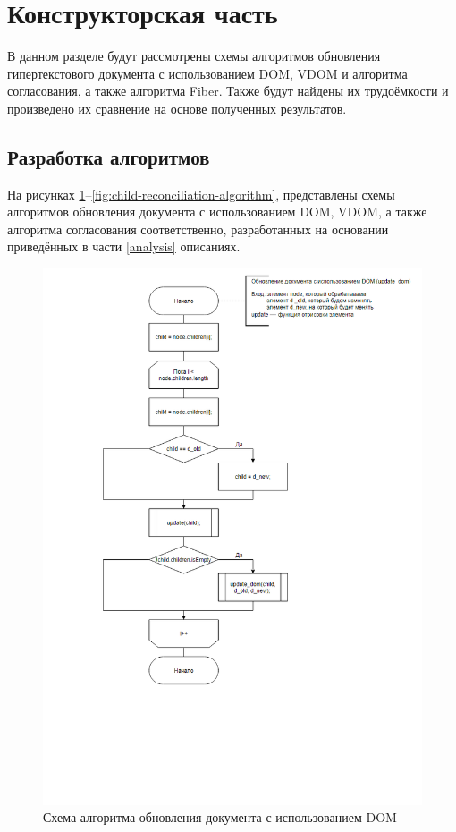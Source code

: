 \section{Конструкторская часть}

В данном разделе будут рассмотрены схемы алгоритмов обновления гипертекстового документа с использованием DOM, VDOM и алгоритма согласования, а также алгоритма Fiber.
Также будут найдены их трудоёмкости и произведено их сравнение на основе полученных результатов.

\subsection{Разработка алгоритмов}

На рисунках \ref{fig:dom-algorithm}--\ref{fig:child-reconciliation-algorithm}, представлены схемы алгоритмов обновления документа с использованием DOM, VDOM, а также алгоритма согласования соответственно, разработанных на основании приведённых в части \ref{analysis} описаниях.

\begin{figure}[h]
	\centering
	\includegraphics[width=170mm]{img/dom-algorithm.png}
	\caption{Схема алгоритма обновления документа с использованием DOM}
	\label{fig:dom-algorithm}
\end{figure}

